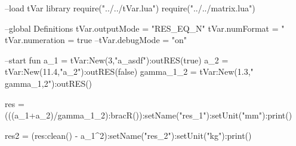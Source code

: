 \documentclass{article}
\begin{document}
\begin{luacode}
	--load tVar library
	require("../../tVar.lua")
	require("../../matrix.lua")
	
	--global Definitions
	tVar.outputMode = "RES_EQ_N"
	tVar.numFormat = "%
	tVar.numeration = true
	--tVar.debugMode = "on"
		
	--start fun
	a_1 = tVar:New(3,"a_{asdf}"):outRES(true)
	a_2 = tVar:New(11.4,"a_2"):outRES(false)
	gamma_1_2 = tVar:New(1.3,"\\gamma_{1,2}"):outRES()
	
	res = (((a_1+a_2)/gamma_1_2):bracR()):setName("res_1"):setUnit("mm"):print()
	
	res2 = (res:clean() - a_1^2):setName("res_2"):setUnit("kg"):print()

	
\end{luacode}
\end{document}
